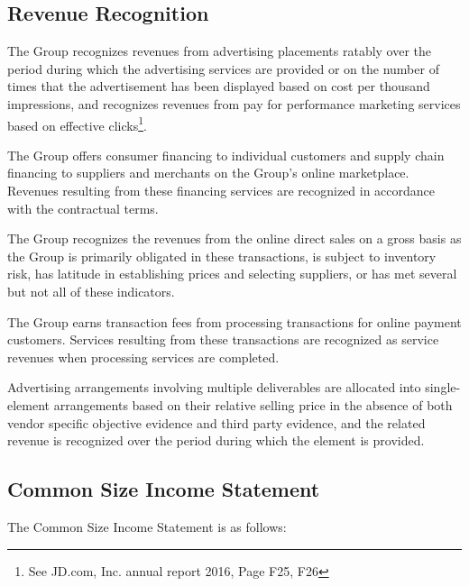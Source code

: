 \subsection{Revenue Recognition}

The Group recognizes revenues from advertising placements ratably over the period during which the advertising services are provided or on the number of times that the advertisement has been displayed based on cost per thousand impressions, and recognizes revenues from pay for performance marketing services based on effective clicks\footnote{See JD.com, Inc. annual report 2016, Page F25, F26}.

The Group offers consumer financing to individual customers and supply chain financing to suppliers and merchants on the Group’s online marketplace. Revenues resulting from these financing services are recognized in accordance with the contractual terms.

The Group recognizes the revenues from the online direct sales on a gross basis as the Group is primarily obligated in these transactions, is subject to inventory risk, has latitude in establishing prices and selecting suppliers, or has met several but not all of these indicators.

The Group earns transaction fees from processing transactions for online payment customers. Services resulting from these transactions are recognized as service revenues when processing services are completed.

Advertising arrangements involving multiple deliverables are allocated into single-element arrangements based on their relative selling price in the absence of both vendor specific objective evidence and third party evidence, and the related revenue is recognized over the period during which the element is provided.

\subsection{Common Size Income Statement}
The Common Size Income Statement is as follows:

